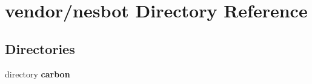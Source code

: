 \section{vendor/nesbot Directory Reference}
\label{dir_46f6caa3f257283f7b84305bfb2127a1}
\subsection*{Directories}
\begin{DoxyCompactItemize}
\item 
directory {\bf carbon}
\end{DoxyCompactItemize}
